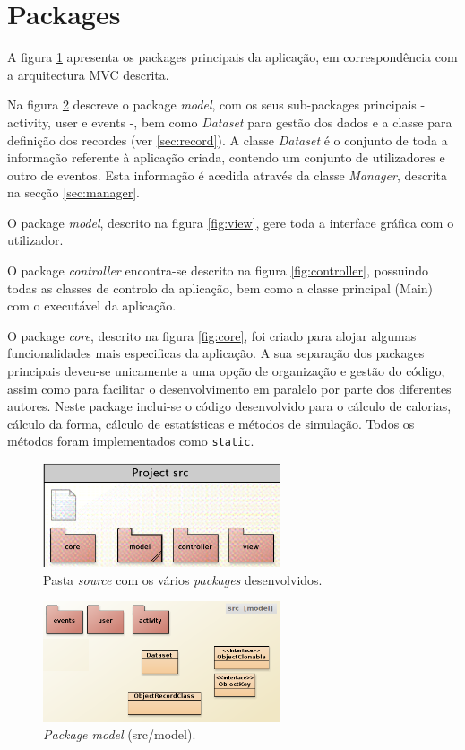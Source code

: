 \documentclass[a4paper,10pt]{report}
\begin{document}
\section{Packages}
\label{sec:packages}
A figura \ref{fig:src} apresenta os packages principais da aplicação, em correspondência com a arquitectura MVC descrita.

Na figura \ref{fig:model} descreve o package \emph{model}, com os seus sub-packages principais - activity, user e events -, 
bem como \emph{Dataset} para gestão dos dados e a classe para definição dos recordes (ver \ref{sec:record}).
A classe \emph{Dataset} é o conjunto de toda a informação referente à aplicação criada, 
contendo um conjunto de utilizadores e outro de eventos. 
Esta informação é acedida através da classe \emph{Manager}, descrita na secção \ref{sec:manager}.

O package \emph{model}, descrito na figura \ref{fig:view}, gere toda a interface gráfica com o utilizador.

O package \emph{controller} encontra-se descrito na figura \ref{fig:controller}, possuindo todas as classes de controlo da aplicação, 
bem como a classe principal (Main) com o executável da aplicação.

O package \emph{core}, descrito na figura \ref{fig:core}, foi criado para alojar algumas funcionalidades mais especificas da aplicação.
A sua separação dos packages principais deveu-se unicamente a uma opção de organização e gestão do código, 
assim como para facilitar o desenvolvimento em paralelo por parte dos diferentes autores.
Neste package inclui-se o código desenvolvido para o cálculo de calorias, cálculo da forma, cálculo de estatísticas e métodos de simulação.
Todos os métodos foram implementados como \verb!static!.

\begin{figure}
\centering
\includegraphics[width=7cm]{src.png}
\caption{Pasta \emph{source} com os vários \emph{packages} desenvolvidos.}
\label{fig:src}
\end{figure}

\begin{figure}
\centering
\includegraphics[width=7cm]{model.png}
\caption{\emph{Package model} (src/model).}
\label{fig:model}
\end{figure}
\end{document}
